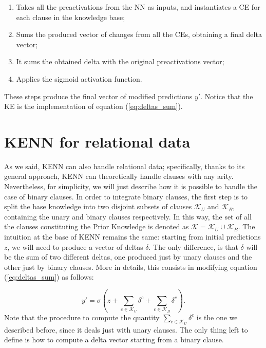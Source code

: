 \begin{enumerate}
	\item Takes all the preactivations from the NN as inputs, and instantiates a CE for each clause in the knowledge base;
		\item Sums the produced vector of changes from all the CEs, obtaining a final delta vector;

	\item It sums the obtained delta with the original preactivations vector;
	\item Applies the sigmoid activation function.
\end{enumerate}


 These steps produce the final vector of modified predictions $y'$. Notice that the KE is the implementation of equation (\ref{eq:deltas_sum}).
 
 \section{KENN for relational data}
 \label{sec:relational_kenn}
 
As we said, KENN can also handle relational data; specifically, thanks to its general approach, KENN can theoretically handle clauses with any arity. Nevertheless, for simplicity, we will just describe how it is possible to handle the case of binary clauses. In order to integrate binary clauses, the first step is to split the base knowledge into two disjoint subsets of clauses $\mathcal{K}_U$ and $\mathcal{K}_B$, containing the unary and binary clauses respectively. In this way, the set of all the clauses constituting the Prior Knowledge is denoted as \mbox{$\mathcal{K} = \mathcal{K}_U \cup \mathcal{K}_B$}. The intuition at the base of KENN remains the same: starting from initial predictions $z$, we will need to produce a vector of deltas $\delta$. The only difference, is that $\delta$ will be the sum of two different deltas, one produced just by unary clauses and the other just by binary clauses. More in details, this consists in modifying equation (\ref{eq:deltas_sum}) as follows:
 
 \begin{equation}
 \label{eq:binary_kenn_eq}
 y'=\sigma(z + \sum_{c\in\mathcal{K}_U}\delta^c + \sum_{c\in\mathcal{K}_B}\delta^c).
 \end{equation}
Note that the procedure to compute the quantity $\sum_{c\in \mathcal{K}_U}\delta^c$ is the one we described before, since it deals just with unary clauses. The only thing left to define is how to compute a delta vector starting from a binary clause. 


